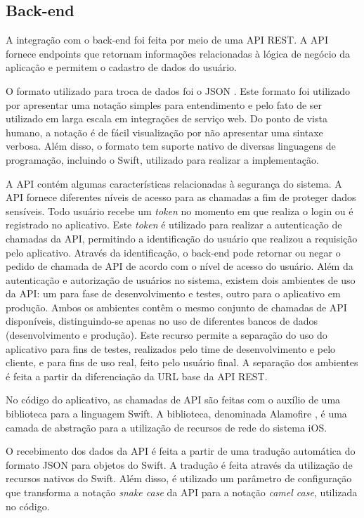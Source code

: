 \subsection{Back-end}
A integração com o back-end foi feita por meio de uma API REST. A API fornece endpoints que retornam informações relacionadas à lógica de negócio da aplicação e permitem o cadastro de dados do usuário.

O formato utilizado para troca de dados foi o JSON . Este formato foi utilizado por apresentar uma notação simples para entendimento e pelo fato de ser utilizado em larga escala em integrações de serviço web. Do ponto de vista humano, a notação é de fácil visualização por não apresentar uma sintaxe verbosa. Além disso, o formato tem suporte nativo de diversas linguagens de programação, incluindo o Swift, utilizado para realizar a implementação.


A API contém algumas características relacionadas à segurança do sistema. A API fornece diferentes níveis de acesso para as chamadas a fim de proteger dados sensíveis. Todo usuário recebe um \textit{token} no momento em que realiza o login ou é registrado no aplicativo. Este \textit{token} é utilizado para realizar a autenticação de chamadas da API, permitindo a identificação do usuário que realizou a requisição pelo aplicativo. Através da identificação, o back-end pode retornar ou negar o pedido de chamada de API de acordo com o nível de acesso do usuário. Além da autenticação e autorização de usuários no sistema, existem dois ambientes de uso da API: um para fase de desenvolvimento e testes, outro para o aplicativo em produção. Ambos os ambientes contêm o mesmo conjunto de chamadas de API disponíveis, distinguindo-se apenas no uso de diferentes bancos de dados (desenvolvimento e produção). Este recurso permite a separação do uso do aplicativo para fins de testes, realizados pelo time de desenvolvimento e pelo cliente, e para fins de uso real, feito pelo usuário final. A separação dos ambientes é feita a partir da diferenciação da URL base da API REST.

No código do aplicativo, as chamadas de API são feitas com o auxílio de uma biblioteca para a linguagem Swift. A biblioteca, denominada Alamofire , é uma camada de abstração para a utilização de recursos de rede do sistema iOS.

O recebimento dos dados da API é feita a partir de uma tradução automática do formato JSON para objetos do Swift. A tradução é feita através da utilização de recursos nativos do Swift. Além disso, é utilizado um parâmetro de configuração que transforma a notação \textit{snake case} da API para a notação \textit{camel case}, utilizada no código.

